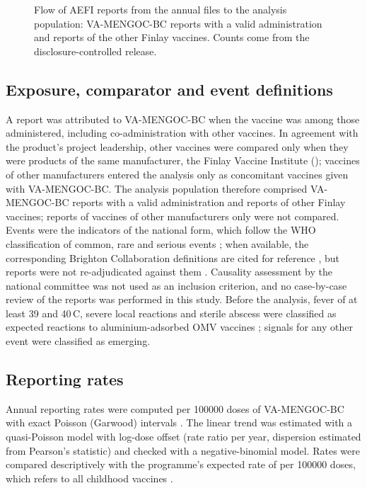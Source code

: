 \documentclass[11pt]{article}
\begin{document}
\begin{figure}[tbp]
\centering
\ReportFlow
\caption{Flow of AEFI reports from the annual files to the analysis population: VA-MENGOC-BC
reports with a valid administration and reports of the other Finlay vaccines. Counts come from
the disclosure-controlled release.}
\label{fig:flow}
\end{figure}

\subsection{Exposure, comparator and event definitions}\label{sec:events}
A report was attributed to VA-MENGOC-BC when the vaccine was among those administered, including
co-administration with other vaccines. In agreement with the product's project leadership, other
vaccines were compared only when they were products of the same manufacturer, the Finlay Vaccine
Institute (\POComparatorList); vaccines of other manufacturers entered the analysis only as
concomitant vaccines given with VA-MENGOC-BC. The analysis population therefore comprised
\PONTargetAnalysed{} VA-MENGOC-BC reports with a valid administration and \PONFinlayComparator{}
reports of other Finlay vaccines; \PONNonFinlayOnly{} reports of vaccines of other manufacturers
only were not compared. Events were the \PONEventsScreened{} indicators of the national form, which
follow the WHO classification of common, rare and serious events \cite{WHO2016AEFI,CIOMS2012};
when available, the corresponding Brighton Collaboration definitions are cited for reference
\cite{Marcy2004,Bonhoeffer2004Crying,Bonhoeffer2004Seizure,Ruggeberg2007,Kohl2007,Buettcher2007,Wise2007,Gidudu2008,Sejvar2007,Tapiainen2007},
but reports were not re-adjudicated against them \cite{Kohl2008}. Causality assessment by the
national committee \cite{WHO2018Causality} was not used as an inclusion criterion, and no
case-by-case review of the reports was performed in this study. Before the analysis, fever of at
least 39 and 40\,\textdegree{}C, severe local reactions and sterile abscess were classified as
expected reactions to aluminium-adsorbed OMV vaccines \cite{Nokleby2007,Holst2009,Jefferson2004};
signals for any other event were classified as emerging.

\subsection{Reporting rates}\label{sec:m-rates}
Annual reporting rates were computed per \num{100000} doses of VA-MENGOC-BC with exact Poisson
(Garwood) intervals \cite{Garwood1936}. The linear trend was estimated with a quasi-Poisson model
with log-dose offset (rate ratio per year, dispersion estimated from Pearson's statistic) and
checked with a negative-binomial model. Rates were compared descriptively with the programme's
expected rate of \POExpectedRate{} per \num{100000} doses, which refers to all childhood vaccines
\cite{CruzRodriguez2021,Mahaux2016}.
\end{document}
